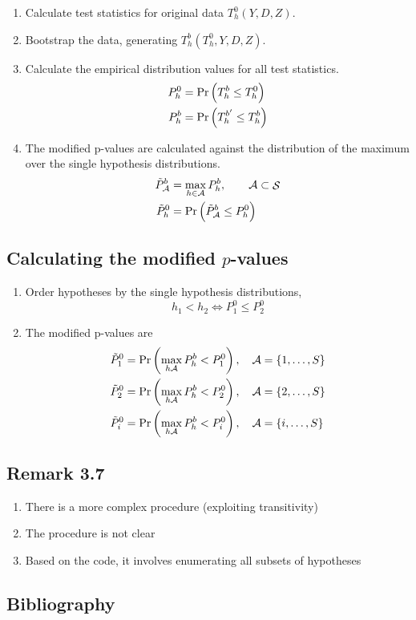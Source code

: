 \documentclass[10pt]{article}
\DeclareMathOperator{\hypSet}{\mathcal{S}}
\begin{document}
	\begin{enumerate}
		\item Calculate test statistics for original data $T^0_h(Y,D,Z)$.
		\item Bootstrap the data, generating $T^b_h(T^0_h,Y,D,Z)$.
		\item Calculate the empirical distribution values for all test statistics.
			\begin{align*}
				P^0_h &= \myPr{T^b_h \leq T^0_h}  \\
				P^b_h &= \myPr{T^{b^\prime}_h \leq T^b_h} 
			\end{align*}
		\item The modified p-values are calculated against the distribution of the maximum over the single hypothesis distributions.
			\begin{align*}
				\tilde{P}^b_{\mathcal{A}} &= \max_{h\in\mathcal{A}} P^b_h, \qquad \mathcal{A} \subset \hypSet \\
				\tilde{P}^0_h &= \myPr{ \tilde{P}^b_{\mathcal{A}} \leq P^0_h }
			\end{align*}			
	\end{enumerate}

	\subsection[Calculating the modified p-values]{Calculating the modified $p$-values}

	\begin{enumerate}[nosep]
		\item Order hypotheses by the single hypothesis distributions,
	\begin{equation*} h_1 < h_2 \iff P^0_{1} \leq P^0_{2} \end{equation*}
		\item The modified p-values are
			\begin{align*}
				\tilde{P}^0_1 &= \myPr{\max_{h\mathcal{A}} P^b_h < P^0_1 },\quad \mathcal{A} = \set{1,\ldots, S} \\
				\tilde{P}^0_2 &= \myPr{\max_{h\mathcal{A}} P^b_h < P^0_2 },\quad \mathcal{A} = \set{2,\ldots, S} \\
				\tilde{P}^0_i &= \myPr{\max_{h\mathcal{A}} P^b_h < P^0_i },\quad \mathcal{A} = \set{i,\ldots, S}
			\end{align*}			
	\end{enumerate}
	
	\subsection{Remark 3.7}

	\begin{enumerate}
		\item There is a more complex procedure (exploiting transitivity)
		\item The procedure is not clear
		\item Based on the code, it involves enumerating all subsets of hypotheses
	\end{enumerate}

	\subsection{Bibliography}

	\printbibliography
\end{document}
